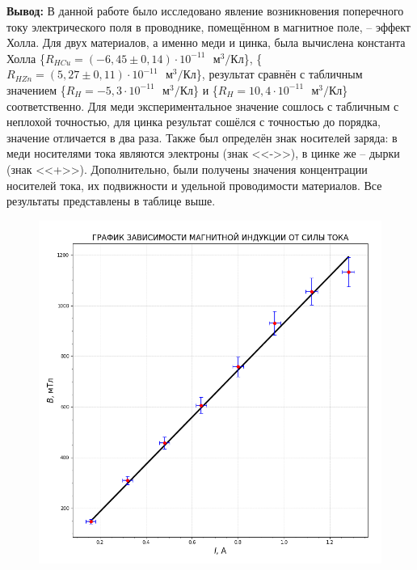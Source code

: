 \documentclass[a4paper,12pt]{article}
\begin{document}
\textbf{Вывод:} В данной работе было исследовано явление возникновения поперечного току электрического поля в проводнике, помещённом в магнитное поле, -- эффект Холла. 
Для двух материалов, а именно меди и цинка, была вычислена константа Холла \{$R_{H Cu} = (-6,45 \pm 0,14) \cdot 10^{-11} \text{ } м^3 / Кл$\}, \{$R_{H Zn} = (5,27 \pm 0,11) \cdot 10^{-11} \text{ } м^3 / Кл$\}, результат сравнён с табличным значением \{$R_H = -5,3 \cdot 10^{-11} \text{ } м^3 / Кл$\} и \{$R_H = 10,4 \cdot 10^{-11} \text{ } м^3 / Кл$\} соответственно. Для меди экспериментальное значение сошлось с табличным с неплохой точностью, для цинка результат сошёлся с точностью до порядка, значение отличается в два раза. Также был определён знак носителей заряда: в меди носителями тока являются электроны (знак <<->>), в цинке же -- дырки (знак <<+>>). Дополнительно, были получены значения концентрации носителей тока, их подвижности и удельной проводимости материалов. Все результаты представлены в таблице выше.

\newpage
\begin{figure}[H]\label{fig: B(I)}
    \centering
    \includegraphics[width = 1.\textwidth]{B(I).png}
\end{figure}
\newpage
\end{document}
